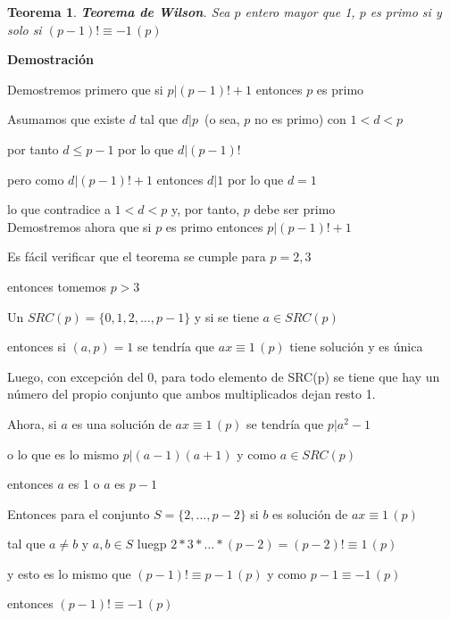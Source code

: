 \documentclass[a4paper,12pt]{report}
\newtheorem*{teo}{Teorema}
\begin{document}
 
 
 \begin{teo}
  \textbf{Teorema de Wilson}. Sea $p$ entero mayor que 1, $p$ es primo si y solo si $(p-1)!\equiv -1\, (p)$
 \end{teo}
 
 \textbf{Demostración}
 
 Demostremos primero que si $p|(p-1)! + 1$ entonces $p$ es primo
 
 Asumamos que existe $d$ tal que $d|p$~(o sea, $p$ no es primo) con $1<d<p$
 
 por tanto $d\leq p-1$ por lo que $d|(p-1)!$
 
 pero como $d|(p-1)!+1$ entonces $d|1$ por lo que $d=1$ 
 
 lo que contradice a $1<d<p$ y, por tanto, $p$ debe ser primo\\
 
 Demostremos ahora que si $p$ es primo entonces $p|(p-1)! + 1$
 
 Es fácil verificar que el teorema se cumple para $p=2,3$ 
 
 entonces tomemos $p>3$
 
 Un $SRC(p)=\{0,1,2,\dots,p-1\}$ y si se tiene $a\in SRC(p)$ 
 
 entonces si $(a,p)=1$  se tendría que $ax\equiv 1\, (p)$ tiene solución y es única
 
 Luego, con excepción del 0, para todo elemento de SRC(p) se tiene que hay un número del propio 
 conjunto que ambos multiplicados dejan resto 1.
 
 Ahora, si $a$ es una solución de $ax\equiv 1\, (p)$ se tendría que $p|a^2-1$ 
 
 o lo que es lo mismo $p|(a-1)(a+1)$ y como $a\in SRC(p)$  
 
 entonces $a$ es 1 o $a$ es $p-1$
 
 Entonces para el conjunto $S=\{2,\dots,p-2\}$ si $b$ es solución de $ax\equiv 1\, (p)$
 
 tal que $a\neq b$ y $a,b\in S$ luegp $2*3*\dots * (p-2)=(p-2)!\equiv 1 \, (p)$
 
 y esto es lo mismo que $(p-1)!\equiv p-1 \, (p)$ y como $p-1\equiv -1 \, (p)$
 
 entonces $(p-1)!\equiv -1 \, (p)$
\end{document}
